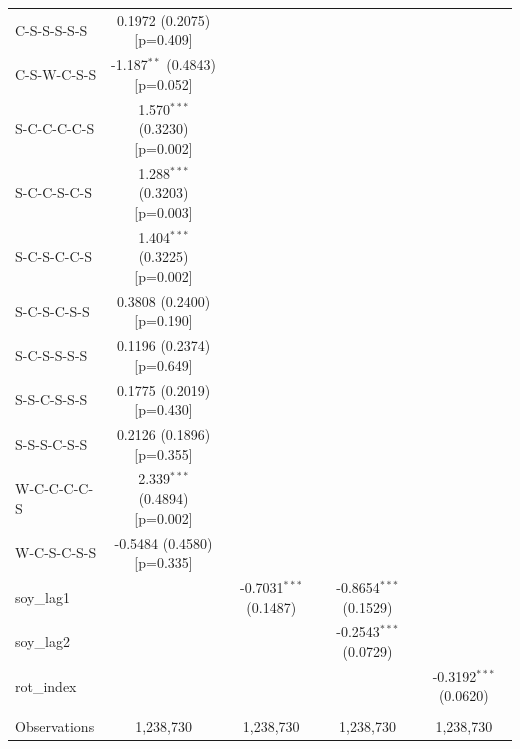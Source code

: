 \begin{table}[H]
\begin{tabular}{lcccc}
      C-S-S-S-S-S                     & 0.1972 (0.2075) [p=0.409]         &                          &                          &   \\   
      C-S-W-C-S-S                     & -1.187$^{**}$ (0.4843) [p=0.052]  &                          &                          &   \\   
      S-C-C-C-C-S                     & 1.570$^{***}$ (0.3230) [p=0.002]  &                          &                          &   \\   
      S-C-C-S-C-S                     & 1.288$^{***}$ (0.3203) [p=0.003]  &                          &                          &   \\   
      S-C-S-C-C-S                     & 1.404$^{***}$ (0.3225) [p=0.002]  &                          &                          &   \\   
      S-C-S-C-S-S                     & 0.3808 (0.2400) [p=0.190]         &                          &                          &   \\   
      S-C-S-S-S-S                     & 0.1196 (0.2374) [p=0.649]         &                          &                          &   \\   
      S-S-C-S-S-S                     & 0.1775 (0.2019) [p=0.430]         &                          &                          &   \\   
      S-S-S-C-S-S                     & 0.2126 (0.1896) [p=0.355]         &                          &                          &   \\   
      W-C-C-C-C-S                     & 2.339$^{***}$ (0.4894) [p=0.002]  &                          &                          &   \\   
      W-C-S-C-S-S                     & -0.5484 (0.4580) [p=0.335]        &                          &                          &   \\   
      soy\_lag1                       &                         & -0.7031$^{***}$ (0.1487) & -0.8654$^{***}$ (0.1529) &   \\   
      soy\_lag2                       &                         &                          & -0.2543$^{***}$ (0.0729) &   \\   
      rot\_index                      &                         &                          &                          & -0.3192$^{***}$ (0.0620)\\   
       \\
      Observations                    & 1,238,730               & 1,238,730                & 1,238,730                & 1,238,730\\  

\end{tabular}
\end{table}
